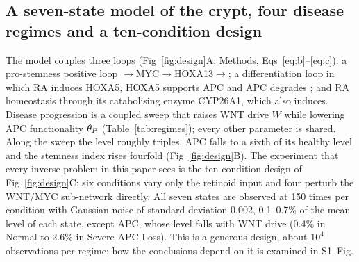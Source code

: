 \subsection{A seven-state model of the crypt, four disease regimes and a
ten-condition design}
\label{sec:res-model}

The model couples three loops (Fig~\ref{fig:design}A; Methods,
Eqs~\eqref{eq:b}--\eqref{eq:c}): a pro-stemness positive loop
\bcat{}$\to$\allowbreak MYC$\to$\allowbreak HOXA13$\to$\allowbreak\bcat{}; a differentiation loop in which RA
induces HOXA5, HOXA5 supports APC and APC degrades \bcat{}; and RA homeostasis
through its catabolising enzyme CYP26A1, which \bcat{} also induces. Disease
progression is a coupled sweep that raises WNT drive $W$ while lowering APC
functionality $\theta_P$ (Table~\ref{tab:regimes}); every other parameter is shared.
Along the sweep the \bcat{} level roughly triples, APC falls to a sixth of its
healthy level and the stemness index rises fourfold (Fig~\ref{fig:design}B). The
experiment that every inverse problem in this paper sees is the ten-condition
design of Fig~\ref{fig:design}C: six conditions vary only the retinoid input and
four perturb the WNT/MYC sub-network directly. All seven states are observed at
150 times per condition with Gaussian noise of standard deviation 0.002, 0.1--0.7\%
of the mean level of each state, except APC, whose level falls with WNT drive
(0.4\% in Normal to 2.6\% in Severe APC Loss).
This is a generous design, about $10^4$ observations per regime; how the
conclusions depend on it is examined in S1~Fig.

